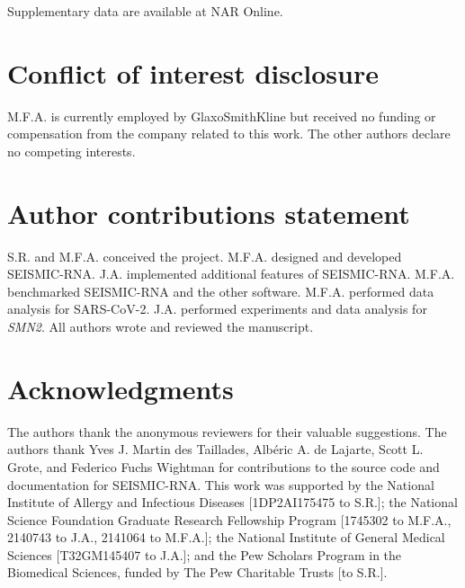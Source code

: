 \documentclass[unnumsec,webpdf,contemporary,large]{oup-authoring-template}%
\theoremstyle{thmstyleone}%
\theoremstyle{thmstyletwo}%
\theoremstyle{thmstylethree}%
\begin{document}
Supplementary data are available at NAR Online.


\section{Conflict of interest disclosure}

M.F.A. is currently employed by GlaxoSmithKline but received no funding or compensation from the company related to this work.
The other authors declare no competing interests.


\section{Author contributions statement}

S.R. and M.F.A. conceived the project.
M.F.A. designed and developed SEISMIC-RNA.
J.A. implemented additional features of SEISMIC-RNA.
M.F.A. benchmarked SEISMIC-RNA and the other software.
M.F.A. performed data analysis for SARS-CoV-2.
J.A. performed experiments and data analysis for \textit{SMN2}.
All authors wrote and reviewed the manuscript.


\section{Acknowledgments}

The authors thank the anonymous reviewers for their valuable suggestions.
The authors thank Yves J. Martin des Taillades, Alb\'eric A. de Lajarte, Scott L. Grote, and Federico Fuchs Wightman for contributions to the source code and documentation for SEISMIC-RNA.
This work was supported by the National Institute of Allergy and Infectious Diseases [1DP2AI175475 to S.R.]; the National Science Foundation Graduate Research Fellowship Program [1745302 to M.F.A., 2140743 to J.A., 2141064 to M.F.A.]; the National Institute of General Medical Sciences [T32GM145407 to J.A.]; and the Pew Scholars Program in the Biomedical Sciences, funded by The Pew Charitable Trusts [to S.R.].


\newpage





\end{document}
